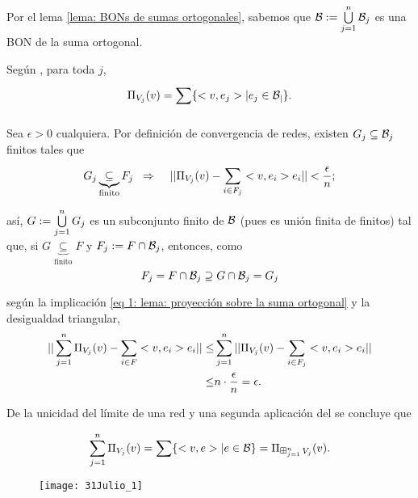 Por el lema \ref{lema: BONs de sumas ortogonales}, sabemos
que $\mathcal{B}:= \bigcup\limits_{j=1}^{n}{\mathcal{B}_{j}}$
es una BON de la suma ortogonal.

Según ,
para toda $j$,
\[
\Pi_{V_{j}}(v)= \sum\limits_{}^{}\{ <v, e_{j}> | e_{j} \in \mathcal{B_{j}} \}.
\]

Sea $\epsilon>0$ cualquiera. Por definición de convergencia
de redes, existen $G_{j} \subseteq \mathcal{B}_{j}$
finitos tales que
\begin{equation} \label{eq 1: lema: proyección sobre la suma ortogonal}
G_{j} \underbrace{\subseteq}_{\text{finito}} F_{j} \hspace{0.2cm}
\Rightarrow \hspace{0.4cm}
|| \Pi_{V_{j}}(v)- \sum\limits_{i \in F_{j}}^{}<v, e_{i}>e_{i}  || < 
\frac{\epsilon}{n};
\end{equation}


así, $G:=\bigcup\limits_{j=1}^{n}{G_{j}}$ es un subconjunto finito de 
$\mathcal{B}$ (pues es unión finita de finitos) tal que,
si $G\underbrace{\subseteq}_{\text{finito}} F$
y $F_{j} := F \cap \mathcal{B}_{j}$, entonces, 
como
\[
F_{j} = F \cap \mathcal{B}_{j} \supseteq 
G \cap \mathcal{B}_{j} = G_{j}
\]

según la implicación 
\eqref{eq 1: lema: proyección sobre la suma ortogonal}
 y la desigualdad triangular, 
\begin{align*}
|| \sum\limits_{j=1}^{n}\Pi_{V_{j}}(v) - \sum\limits_{i \in F}^{}<v, e_{i}>e_{i} ||
\leq &  \sum\limits_{j=1}^{n}||\Pi_{V_{j}}(v)- \sum\limits_{i \in F_{j}}^{}<v, e_{i}>e_{i}|| \\
\leq & n \cdot \frac{\epsilon}{n} = \epsilon.
\end{align*}

De la unicidad del límite de una red
y una segunda aplicación del 
se concluye que

\[
\sum\limits_{j=1}^{n}\Pi_{V_{j}}(v) = 
\sum\limits_{}^{}\{ <v, e> | e \in \mathcal{B} \} = \Pi_{\operatorname*{{\boxplus}}_{j =1 }^{n} V_{j}}(v).
\]

\begin{figure}[H]
	\centering
	\texttt{[image: 31Julio\_1]} 
\end{figure}	



